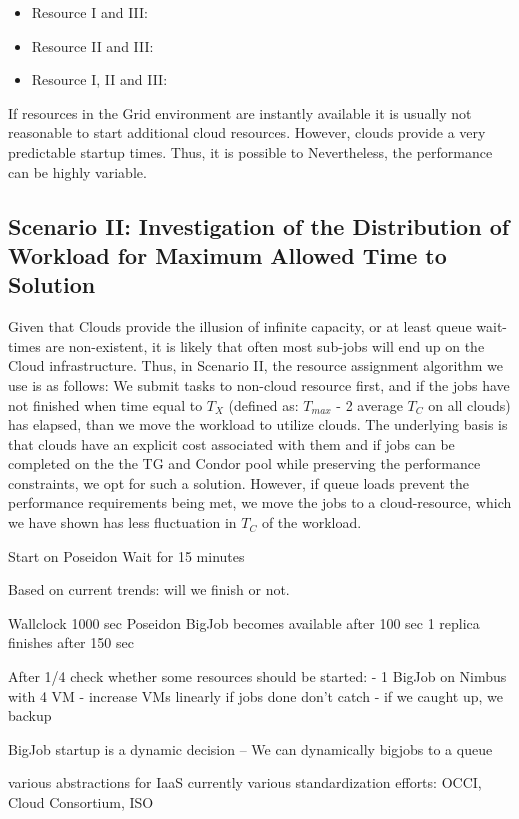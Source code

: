 \documentclass[conference,final]{IEEEtran}
\newcommand{\tmax}{$T_{max}$ }
\newcommand{\tc}{$T_{C}$ }
\begin{document}
\begin{itemize}
\item Resource I and III:
\item Resource II and III:
\item Resource I, II and III:
\end{itemize}


If resources in the Grid environment are instantly available it is usually not reasonable to start
additional cloud resources. However, clouds provide a very predictable startup times. Thus,
it is possible to  Nevertheless,
the performance can be highly variable.

\subsection{Scenario II: Investigation of the Distribution of Workload for Maximum Allowed
  Time to Solution} 

Given that Clouds provide the illusion of infinite capacity, or at
least queue wait-times are non-existent, it is likely that often most
sub-jobs will end up on the Cloud infrastructure.  Thus, in Scenario
II, the resource assignment algorithm we use is as follows: We submit
tasks to non-cloud resource first, and if the jobs have not finished
when time equal to $T_{X}$ (defined as: \tmax - 2 average \tc on all
clouds) has elapsed, than we move the workload to utilize clouds.  The
underlying basis is that clouds have an explicit cost associated with
them and if jobs can be completed on the the TG and Condor pool while
preserving the performance constraints, we opt for such a
solution. However, if queue loads prevent the performance requirements
being met, we move the jobs to a cloud-resource, which we have shown
has less fluctuation in \tc of the workload.

Start on Poseidon
Wait for 15 minutes

Based on current trends: will we finish or not.

Wallclock 1000 sec
Poseidon BigJob becomes available after 100 sec
1 replica finishes after 150 sec

After 1/4 check whether some resources should be started:
- 1 BigJob on Nimbus with 4 VM
- increase VMs linearly if jobs done don't catch
- if we caught up, we backup

BigJob startup is a dynamic decision -- We can dynamically bigjobs to a queue




various abstractions for IaaS currently
various standardization efforts: OCCI, Cloud Consortium, ISO
\end{document}
